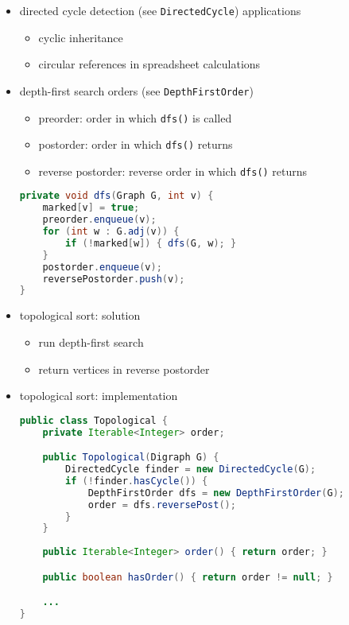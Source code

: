 \documentclass[8pt,a4paper,compress]{beamer}
\begin{document}
\begin{frame}[fragile]
\begin{itemize}
\item directed cycle detection (see \lstinline{DirectedCycle}) applications
\begin{itemize}
\item cyclic inheritance

\item circular references in spreadsheet calculations
\end{itemize}

\item depth-first search orders (see \lstinline{DepthFirstOrder})
\begin{itemize}
\item preorder: order in which \lstinline{dfs()} is called

\item postorder: order in which \lstinline{dfs()} returns

\item reverse postorder: reverse order in which \lstinline{dfs()} returns
\end{itemize}

\begin{lstlisting}[language=Java]
private void dfs(Graph G, int v) {
    marked[v] = true;
    preorder.enqueue(v);
    for (int w : G.adj(v)) {
        if (!marked[w]) { dfs(G, w); }
    }
    postorder.enqueue(v);
    reversePostorder.push(v);
}
\end{lstlisting}
\end{itemize}
\end{frame}

\begin{frame}[fragile]
\begin{itemize}
\item topological sort: solution

\begin{itemize}
\item run depth-first search

\item return vertices in reverse postorder
\end{itemize}

\item topological sort: implementation
\begin{lstlisting}[language=Java]
public class Topological {
    private Iterable<Integer> order; 

    public Topological(Digraph G) {
        DirectedCycle finder = new DirectedCycle(G);
        if (!finder.hasCycle()) {
            DepthFirstOrder dfs = new DepthFirstOrder(G);
            order = dfs.reversePost();
        }
    }
    
    public Iterable<Integer> order() { return order; }

    public boolean hasOrder() { return order != null; }

    ...
}
\end{lstlisting}
\end{itemize}
\end{frame}
\end{document}
